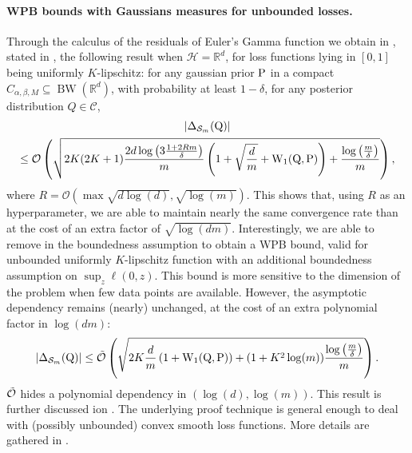 \paragraph{WPB bounds with Gaussians measures for unbounded losses.} Through the calculus of the residuals of Euler's Gamma function we obtain in , stated in , the following result when $\mathcal{H}=\mathbb{R}^d$, for loss functions lying in $[0,1]$ being uniformly $K$-lipschitz: for any gaussian prior $\P$ in a compact $C_{\alpha,\beta,M}\subseteq \operatorname{BW}(\mathbb{R}^d)$, with probability at least $1-\delta$, for any posterior distribution $Q\in \mathcal{C}$,
\begin{multline*} 
    |\Delta_{\Sm}(\Q)| \\ 
    \leq \mathcal{O}\left(\sqrt{2K(2K+1)\frac{2d\log\left(3\frac{1 +2Rm }{\delta}\right)}{m} \left(1+ \sqrt{\frac{d}{m}} + \W_{1}(\Q,\P)  \right) +\frac{\log\left( \frac{m}{\delta} \right)}{m}} \right), 
\end{multline*}
where $R= \mathcal{O}(\max \sqrt{d\log(d)},\sqrt{\log(m)})$.
This shows that, using $R$ as an hyperparameter, we are able to maintain nearly the same convergence rate than  at the cost of an extra factor of $\sqrt{\log(dm)}$.
Interestingly, we are able to remove in  the boundedness assumption to obtain a WPB bound, valid for unbounded uniformly $K$-lipschitz function  with an additional boundedness assumption on $\sup_{z} \ell(0,z)$. This bound is more sensitive to the dimension of the problem when few data points are available. However, the asymptotic dependency remains (nearly) unchanged, at the cost of an extra polynomial factor in $\log(dm)$:
\begin{align}
|\Delta_{\Sm}(\Q)|  \leq\Tilde{\mathcal{O}}\left( \sqrt{2K\frac{d}{m}\left(1 + \W_{1}(\Q,\P)\right)+(1+K^2\log(m))\frac{\log\left( \frac{m}{\delta} \right)}{m}}   \right).
\end{align}
$\Tilde{\mathcal{O}}$ hides a polynomial dependency in $(\log(d),\log(m))$. This result is further discussed ion . The underlying proof technique is general enough to deal with (possibly unbounded) convex smooth loss functions. More details are gathered in .

